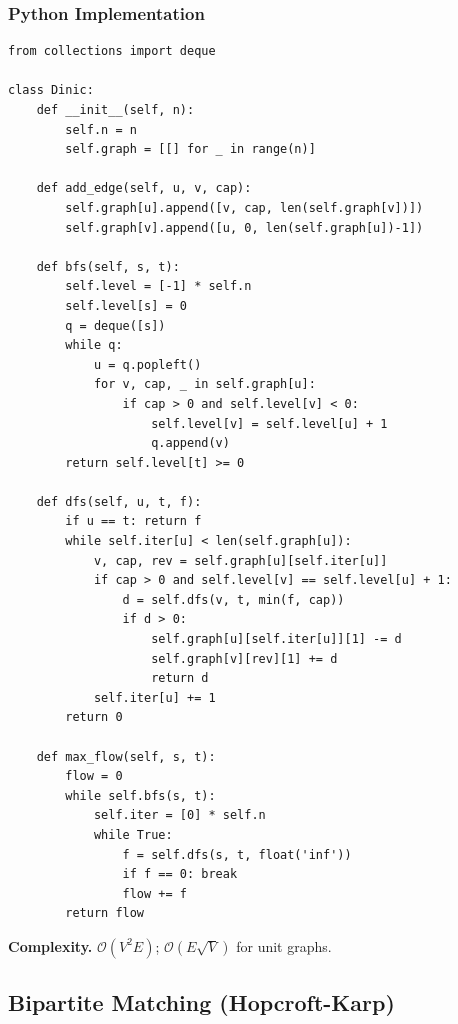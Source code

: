 \documentclass[10pt,a4paper]{article}
\theoremstyle{cpstyle}
\newcommand{\bigO}[1]{\mathcal{O}\!\left(#1\right)}
\begin{document}
\subsubsection{Python Implementation}
\begin{lstlisting}[caption={Dinic's Maximum Flow}]
from collections import deque

class Dinic:
    def __init__(self, n):
        self.n = n
        self.graph = [[] for _ in range(n)]

    def add_edge(self, u, v, cap):
        self.graph[u].append([v, cap, len(self.graph[v])])
        self.graph[v].append([u, 0, len(self.graph[u])-1])

    def bfs(self, s, t):
        self.level = [-1] * self.n
        self.level[s] = 0
        q = deque([s])
        while q:
            u = q.popleft()
            for v, cap, _ in self.graph[u]:
                if cap > 0 and self.level[v] < 0:
                    self.level[v] = self.level[u] + 1
                    q.append(v)
        return self.level[t] >= 0

    def dfs(self, u, t, f):
        if u == t: return f
        while self.iter[u] < len(self.graph[u]):
            v, cap, rev = self.graph[u][self.iter[u]]
            if cap > 0 and self.level[v] == self.level[u] + 1:
                d = self.dfs(v, t, min(f, cap))
                if d > 0:
                    self.graph[u][self.iter[u]][1] -= d
                    self.graph[v][rev][1] += d
                    return d
            self.iter[u] += 1
        return 0

    def max_flow(self, s, t):
        flow = 0
        while self.bfs(s, t):
            self.iter = [0] * self.n
            while True:
                f = self.dfs(s, t, float('inf'))
                if f == 0: break
                flow += f
        return flow
\end{lstlisting}

\textbf{Complexity.} $\bigO{V^2 E}$; $\bigO{E\sqrt{V}}$ for unit graphs.

\subsection{Bipartite Matching (Hopcroft-Karp)}
\end{document}
